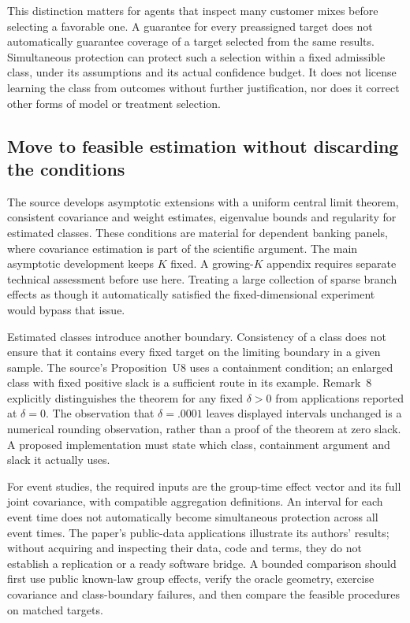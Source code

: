 This distinction matters for agents that inspect many customer mixes before
selecting a favorable one. A guarantee for every preassigned target does not
automatically guarantee coverage of a target selected from the same results.
Simultaneous protection can protect such a selection within a fixed admissible
class, under its assumptions and its actual confidence budget. It does not
license learning the class from outcomes without further justification, nor
does it correct other forms of model or treatment selection.

\subsection{Move to feasible estimation without discarding the conditions}

The source develops asymptotic extensions with a uniform central limit theorem,
consistent covariance and weight estimates, eigenvalue bounds and regularity
for estimated classes. These conditions are material for dependent banking
panels, where covariance estimation is part of the scientific argument.
The main asymptotic development keeps $K$ fixed. A growing-$K$ appendix
requires separate technical assessment before use here. Treating a large
collection of sparse branch effects as though it automatically satisfied the
fixed-dimensional experiment would bypass that issue.

Estimated classes introduce another boundary. Consistency of a class does not
ensure that it contains every fixed target on the limiting boundary in a given
sample. The source's Proposition~U8 uses a containment condition; an enlarged
class with fixed positive slack is a sufficient route in its example.
Remark~8 explicitly distinguishes the theorem for any fixed $\delta>0$ from
applications reported at $\delta=0$. The observation that $\delta=.0001$
leaves displayed intervals unchanged is a numerical rounding observation,
rather than a proof of the theorem at zero slack. A proposed implementation
must state which class, containment argument and slack it actually uses.

For event studies, the required inputs are the group-time effect vector and
its full joint covariance, with compatible aggregation definitions. An interval
for each event time does not automatically become simultaneous protection
across all event times. The paper's public-data applications illustrate its
authors' results; without acquiring and inspecting their data, code and terms,
they do not establish a replication or a ready software bridge. A bounded
comparison should first use public known-law group effects, verify the oracle
geometry, exercise covariance and class-boundary failures, and then compare
the feasible procedures on matched targets.

